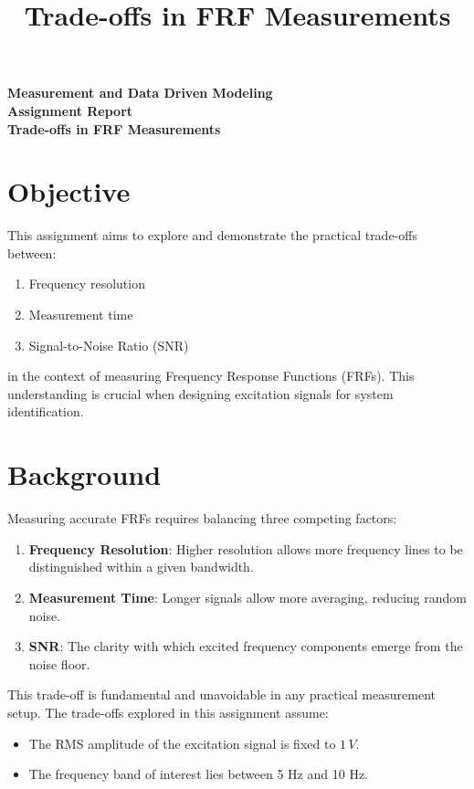 \documentclass[a4paper,12pt]{article}
\title{Trade-offs in FRF Measurements}
\author{}
\date{}
\begin{document}
\begin{center}
    \Large \textbf{Measurement and Data Driven Modeling}\\
    \vspace{0.3cm}
    \LARGE \textbf{Assignment Report}\\
    \vspace{0.5cm}
    \Large \textbf{Trade-offs in FRF Measurements}\\
    \vspace{1cm}
\end{center}

\section*{Objective}
This assignment aims to explore and demonstrate the practical trade-offs between:
\begin{enumerate}
    \item Frequency resolution
    \item Measurement time
    \item Signal-to-Noise Ratio (SNR)
\end{enumerate}
in the context of measuring Frequency Response Functions (FRFs). This understanding is crucial when designing excitation signals for system identification.

\section*{Background}
Measuring accurate FRFs requires balancing three competing factors:
\begin{enumerate}
    \item \textbf{Frequency Resolution}: Higher resolution allows more frequency lines to be distinguished within a given bandwidth.
    \item \textbf{Measurement Time}: Longer signals allow more averaging, reducing random noise.
    \item \textbf{SNR}: The clarity with which excited frequency components emerge from the noise floor.
\end{enumerate}
This trade-off is fundamental and unavoidable in any practical measurement setup. The trade-offs explored in this assignment assume:
\begin{itemize}
    \item The RMS amplitude of the excitation signal is fixed to \(1 \,V\).
    \item The frequency band of interest lies between 5 Hz and 10 Hz.
\end{itemize}
\end{document}
